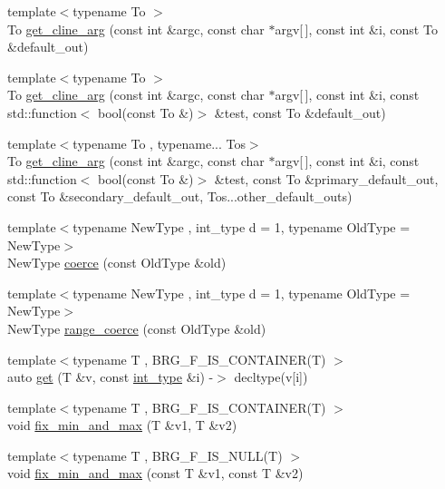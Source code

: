 \begin{DoxyCompactItemize}
\item 
{\footnotesize template$<$typename To $>$ }\\To \hyperlink{namespaceIceBRG_ad6e7875dca5d5dd7b6be7bec2f14bb04}{get\+\_\+cline\+\_\+arg} (const int \&argc, const char $\ast$argv\mbox{[}$\,$\mbox{]}, const int \&i, const To \&default\+\_\+out)
\item 
{\footnotesize template$<$typename To $>$ }\\To \hyperlink{namespaceIceBRG_ad87dd6b92237fba5a42dbeacac9fffc0}{get\+\_\+cline\+\_\+arg} (const int \&argc, const char $\ast$argv\mbox{[}$\,$\mbox{]}, const int \&i, const std\+::function$<$ bool(const To \&)$>$ \&test, const To \&default\+\_\+out)
\item 
{\footnotesize template$<$typename To , typename... Tos$>$ }\\To \hyperlink{namespaceIceBRG_a429b26c37fb4c307de54593208a1613f}{get\+\_\+cline\+\_\+arg} (const int \&argc, const char $\ast$argv\mbox{[}$\,$\mbox{]}, const int \&i, const std\+::function$<$ bool(const To \&)$>$ \&test, const To \&primary\+\_\+default\+\_\+out, const To \&secondary\+\_\+default\+\_\+out, Tos...\+other\+\_\+default\+\_\+outs)
\item 
{\footnotesize template$<$typename New\+Type , int\+\_\+type d = 1, typename Old\+Type  = New\+Type$>$ }\\New\+Type \hyperlink{namespaceIceBRG_a75bea19938f98230645198228e8b11f7}{coerce} (const Old\+Type \&old)
\item 
{\footnotesize template$<$typename New\+Type , int\+\_\+type d = 1, typename Old\+Type  = New\+Type$>$ }\\New\+Type \hyperlink{namespaceIceBRG_a1cb0b56c6ec1f1c1398efc974ef0bd37}{range\+\_\+coerce} (const Old\+Type \&old)
\item 
{\footnotesize template$<$typename T , B\+R\+G\+\_\+\+F\+\_\+\+I\+S\+\_\+\+C\+O\+N\+T\+A\+I\+N\+E\+R(\+T) $>$ }\\auto \hyperlink{namespaceIceBRG_a8120f8c8706b2c356cb8c8bad6063e4a}{get} (T \&v, const \hyperlink{lib_2IceBRG__main_2common_8h_ac4de9d9335536ac22821171deec8d39e}{int\+\_\+type} \&i) -\/$>$ decltype(v\mbox{[}i\mbox{]})
\item 
{\footnotesize template$<$typename T , B\+R\+G\+\_\+\+F\+\_\+\+I\+S\+\_\+\+C\+O\+N\+T\+A\+I\+N\+E\+R(\+T) $>$ }\\void \hyperlink{namespaceIceBRG_a6a80d91835add9f6719b9233a19cdea5}{fix\+\_\+min\+\_\+and\+\_\+max} (T \&v1, T \&v2)
\item 
{\footnotesize template$<$typename T , B\+R\+G\+\_\+\+F\+\_\+\+I\+S\+\_\+\+N\+U\+L\+L(\+T) $>$ }\\void \hyperlink{namespaceIceBRG_a084bf1186811c3fd362d52cf79e3948c}{fix\+\_\+min\+\_\+and\+\_\+max} (const T \&v1, const T \&v2)

\end{DoxyCompactItemize}

